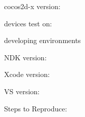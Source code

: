 
\begin{DoxyItemize}
\item cocos2d-\/x version\+:
\item devices test on\+:
\item developing environments
\begin{DoxyItemize}
\item N\+DK version\+:
\item Xcode version\+:
\item VS version\+:
\end{DoxyItemize}
\end{DoxyItemize}

Steps to Reproduce\+:


\begin{DoxyEnumerate}
\item 
\item 
\end{DoxyEnumerate}